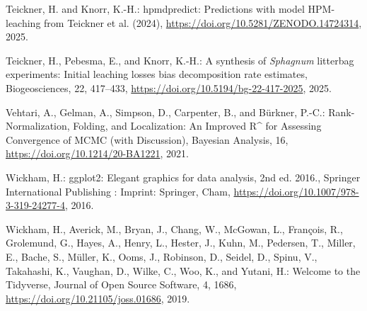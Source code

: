 \documentclass[
  12pt,
]{article}
\newlength{\cslhangindent}
\newlength{\cslentryspacingunit} %
\newenvironment{CSLReferences}[2] %
 {%
  \setlength{\parindent}{0pt}
  \ifodd #1
  \let\oldpar\par
  \def\par{\hangindent=\cslhangindent\oldpar}
  \fi
  \setlength{\parskip}{#2\cslentryspacingunit}
 }%
 {}
\begin{document}
\begin{CSLReferences}{0}{0}
\leavevmode{}%
Teickner, H. and Knorr, K.-H.: {hpmdpredict}: {Predictions} with model {HPM-leaching} from {Teickner} et al. (2024), \url{https://doi.org/10.5281/ZENODO.14724314}, 2025.

\leavevmode{}%
Teickner, H., Pebesma, E., and Knorr, K.-H.: A synthesis of {\emph{Sphagnum}} litterbag experiments: Initial leaching losses bias decomposition rate estimates, Biogeosciences, 22, 417--433, \url{https://doi.org/10.5194/bg-22-417-2025}, 2025.

\leavevmode{}%
Vehtari, A., Gelman, A., Simpson, D., Carpenter, B., and Bürkner, P.-C.: Rank-{Normalization}, {Folding}, and {Localization}: {An Improved R{\^{}}} for {Assessing Convergence} of {MCMC} (with {Discussion}), Bayesian Analysis, 16, \url{https://doi.org/10.1214/20-BA1221}, 2021.

\leavevmode{}%
Wickham, H.: {ggplot2}: {Elegant} graphics for data analysis, 2nd ed. 2016., Springer International Publishing : Imprint: Springer, Cham, \url{https://doi.org/10.1007/978-3-319-24277-4}, 2016.

\leavevmode{}%
Wickham, H., Averick, M., Bryan, J., Chang, W., McGowan, L., François, R., Grolemund, G., Hayes, A., Henry, L., Hester, J., Kuhn, M., Pedersen, T., Miller, E., Bache, S., Müller, K., Ooms, J., Robinson, D., Seidel, D., Spinu, V., Takahashi, K., Vaughan, D., Wilke, C., Woo, K., and Yutani, H.: Welcome to the {Tidyverse}, Journal of Open Source Software, 4, 1686, \url{https://doi.org/10.21105/joss.01686}, 2019.

\end{CSLReferences}
\end{document}
